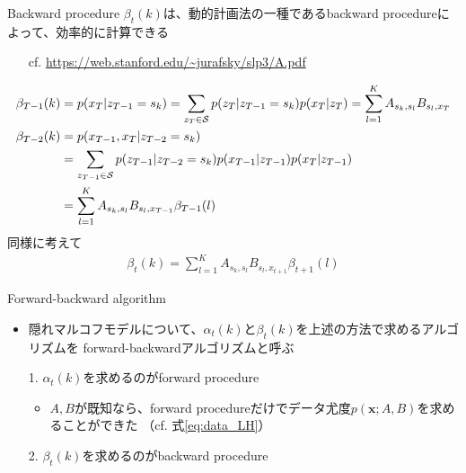 \documentclass[aspectratio=169,unicode,dvipdfmx,14pt]{beamer}
\begin{document}
\begin{frame}{Backward procedure}
\FontMath
$\beta_t(k)$は、動的計画法の一種であるbackward procedureによって、効率的に計算できる
\begin{itemize}
\item[cf.] \href{https://web.stanford.edu/~jurafsky/slp3/A.pdf}{https://web.stanford.edu/\~{}jurafsky/slp3/A.pdf}
\end{itemize}
\vspace{-.1in}
\begin{align}
\beta_{T-1}(k) & = p(x_T|z_{T-1}=s_k) = \sum_{z_T \in \mathcal{S}} p(z_T|z_{T-1}=s_k)p(x_T|z_T)
= \sum_{l=1}^K A_{s_k, s_l} B_{s_l, x_T}
\\
\beta_{T-2}(k) & = p(x_{T-1},x_T|z_{T-2}=s_k)
\notag \\ &
= \sum_{z_{T-1} \in \mathcal{S}} p(z_{T-1}|z_{T-2}=s_k)p(x_{T-1}|z_{T-1})p(x_T|z_{T-1})
\notag \\ &
= \sum_{l=1}^K A_{s_k, s_l} B_{s_l,x_{T-1}} \beta_{T-1}(l)
\end{align}
同様に考えて
\begin{align}
\beta_t(k) = \sum_{l=1}^K A_{s_k, s_l} B_{s_l, x_{t+1}} \beta_{t+1}(l)
\end{align}
\end{frame}

\begin{frame}{Forward-backward algorithm}
\begin{itemize}
\item 隠れマルコフモデルについて、$\alpha_t(k)$と$\beta_t(k)$を上述の方法で求めるアルゴリズムを
forward-backwardアルゴリズムと呼ぶ
\item[1.] $\alpha_t(k)$を求めるのがforward procedure
\begin{itemize}
\item $A,B$が既知なら、forward procedureだけでデータ尤度$p(\bm{x};A,B)$を求めることができた
（cf. 式\eqref{eq:data_LH}）
\end{itemize}
\item[2.] $\beta_t(k)$を求めるのがbackward procedure
\end{itemize}
\end{frame}
\end{document}
